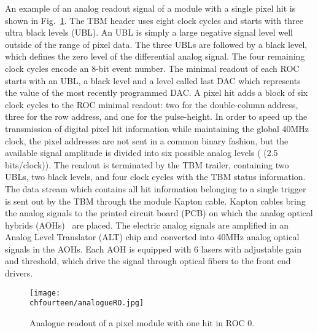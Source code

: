 An example of an analog readout signal of a module with a single pixel hit is shown in Fig.~\ref{fig:ModuleReadout}.
The TBM header uses eight clock cycles and starts with three ultra black levels (UBL). An UBL is simply a large negative signal level well outside of the range of pixel data.
The three UBLs are followed by a black level, which defines the zero level of the differential analog signal.
The four remaining clock cycles encode an 8-bit event number.
The minimal readout of each ROC starts with an UBL, a black level and a level called last DAC which represents the value of the most recently programmed DAC.
A pixel hit adds a block of six clock cycles to the ROC minimal readout: two for the double-column address, three for the row address, and one for the pulse-height.
In order to speed up the transmission of digital pixel hit information while maintaining the global 40\unit{MHz} clock,
the pixel addresses are not sent in a common binary fashion, but the available signal amplitude is divided into six possible analog levels ( (2.5 bits/clock)).
The readout is terminated by the TBM trailer, containing two UBLs, two black levels, and four clock cycles with the TBM status information.
The data stream which contains all hit information belonging to a single trigger is sent out by the TBM through the module Kapton cable.
Kapton cables bring the analog signals to the printed circuit board (PCB) on which the analog optical hybrids (AOHs)~\cite{1221923} are placed.
The electric analog signals are amplified in an Analog Level Translator (ALT) chip and converted into 40\unit{MHz} analog optical signals in the AOHs.
Each AOH is equipped with 6 lasers with adjustable gain and threshold, which drive the signal through optical fibers to the front end drivers.

\begin{figure}[!htb]
 \begin{center}
 \texttt{[image: \\chfourteen/analogueRO.jpg]}
 \end{center}
 \caption{Analogue readout of a pixel module with one hit in ROC 0.}
 \label{fig:ModuleReadout}
\end{figure}


